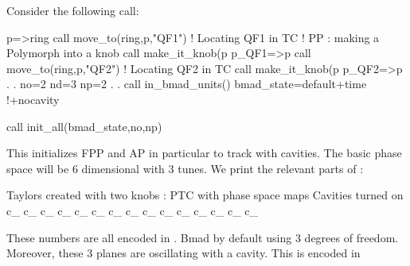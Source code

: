 \documentclass{hitec}     %
\begin{document}
{ Consider the following call:
 
\begin{code}
p=>ring%
call move_to(ring,p,"QF1")   !  Locating QF1 in TC
!  PP : making a Polymorph into a knob
call make_it_knob(p%
p_QF1=>p
call move_to(ring,p,"QF2")   ! Locating QF2 in TC
call make_it_knob(p%
p_QF2=>p
	.
	.
no=2
nd=3
np=2
	.
	.
call in_bmad_units()
bmad_state=default+time      !+nocavity

call init_all(bmad_state,no,np)
\end{code}
 
 This initializes FPP and AP in particular to track with cavities. The basic phase space will be 6 dimensional with 3 tunes. We print the relevant parts of :
 
 \begin{code}
  Taylors created with two knobs : PTC with phase space maps
 Cavities turned on
        c_%
        c_%
        c_%
       c_%
   c_%
      c_%
 c_%
        c_%
  c_%
       c_%
      c_%
 c_%
         c_%
    c_%
       c_%
 \end{code}

 These numbers are all encoded in . Bmad by default using 3 degrees of freedom. Moreover, these 3 planes are oscillating with a cavity. This is encoded in \vn{c_%
 Notice that there are 8 variables total: 2 quadrupole strengths at location \newline
   \vn{c_%
 
 Before we go into a detailed explanations of type \vn{c_damap}, we show a more complex call to \vn{init_all}. We run PTC with the \vn{internal_state}  
 \begin{code}
 	.
 	.
 call in_bmad_units()
!call in_ptc_units()
bmad_state=default+time0+nocavity0
bmad_state=bmad_state+modulation0+spin0
 	.
 	.
  \end{code}
  and then we get:  
 \begin{code}
 Taylors created with 2 knobs : PTC with phase space maps
  without a cavity and modulation on a magnet
        c_%
        c_%
        c_%
       c_%
   c_%
      c_%
 c_%
        c_%
  c_%
       c_%
      c_%
 c_%
         c_%
    c_%
       c_%
 \end{code}
 
}}}
\end{document}
